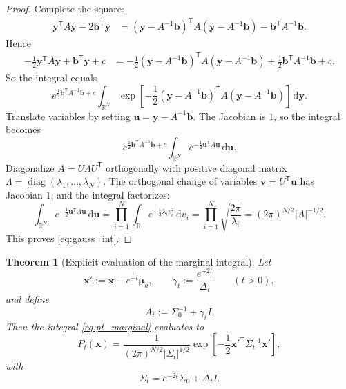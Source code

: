 \documentclass[11pt]{article}
\numberwithin{equation}{section}
\newtheorem{theorem}{Theorem}[section]
\theoremstyle{definition}
\theoremstyle{remark}
\newcommand{\R}{\mathbb{R}}
\newcommand{\diag}{\operatorname{diag}}
\newcommand{\Id}{I}
\newcommand{\trans}{\mathsf{T}}
\newcommand{\diff}{\,\mathrm{d}}
\begin{document}
\begin{proof}
Complete the square:
\begin{align*}
\mathbf y^\trans A\mathbf y - 2\mathbf b^\trans\mathbf y
&=
(\mathbf y-A^{-1}\mathbf b)^\trans A(\mathbf y-A^{-1}\mathbf b)-\mathbf b^\trans A^{-1}\mathbf b.
\end{align*}
Hence
\begin{align*}
-\frac12\mathbf y^\trans A\mathbf y+\mathbf b^\trans\mathbf y+c
&=
-\frac12(\mathbf y-A^{-1}\mathbf b)^\trans A(\mathbf y-A^{-1}\mathbf b)
+\frac12\mathbf b^\trans A^{-1}\mathbf b+c.
\end{align*}
So the integral equals
\[
e^{\frac12\mathbf b^\trans A^{-1}\mathbf b+c}
\int_{\R^N}\exp\!\left[-\frac12(\mathbf y-A^{-1}\mathbf b)^\trans A(\mathbf y-A^{-1}\mathbf b)\right]\diff\mathbf y.
\]
Translate variables by setting $\mathbf u=\mathbf y-A^{-1}\mathbf b$. The Jacobian is $1$, so the integral becomes
\[
e^{\frac12\mathbf b^\trans A^{-1}\mathbf b+c}
\int_{\R^N}e^{-\frac12\mathbf u^\trans A\mathbf u}\diff\mathbf u.
\]
Diagonalize $A=U\Lambda U^\trans$ orthogonally with positive diagonal matrix $\Lambda=\diag(\lambda_1,\dots,\lambda_N)$. The orthogonal change of variables $\mathbf v=U^\trans\mathbf u$ has Jacobian $1$, and the integral factorizes:
\[
\int_{\R^N}e^{-\frac12\mathbf u^\trans A\mathbf u}\diff\mathbf u
=
\prod_{i=1}^N\int_{\R}e^{-\frac12\lambda_i v_i^2}\diff v_i
=
\prod_{i=1}^N\sqrt{\frac{2\pi}{\lambda_i}}
=
(2\pi)^{N/2}|A|^{-1/2}.
\]
This proves \eqref{eq:gauss_int}.
\end{proof}

\begin{theorem}[Explicit evaluation of the marginal integral]\label{thm:pt_direct}
Let
\[
\mathbf x' := \mathbf x-e^{-t}\boldsymbol{\mu}_a,
\qquad
\gamma_t:=\frac{e^{-2t}}{\Delta_t}
\qquad (t>0),
\]
and define
\[
A_t:=\Sigma_0^{-1}+\gamma_t\Id.
\]
Then the integral \eqref{eq:pt_marginal} evaluates to
\[
P_t(\mathbf x)
=
\frac{1}{(2\pi)^{N/2}|\Sigma_t|^{1/2}}
\exp\!\left[-\frac12\mathbf x'^\trans\Sigma_t^{-1}\mathbf x'\right],
\]
with
\[
\Sigma_t = e^{-2t}\Sigma_0+\Delta_t\Id.
\]
\end{theorem}
\end{document}
